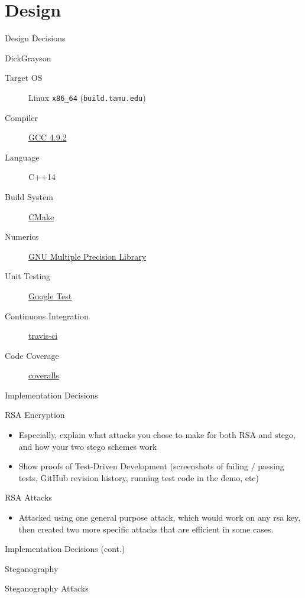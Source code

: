 \documentclass[presentation]{beamer}
\begin{document}
\section{Design}
\label{sec:orgheadline1}
\begin{frame}[fragile,label=sec-2-1]{Design Decisions}
 \begin{block}{DickGrayson}
\begin{description}
\item[{Target OS}] Linux \texttt{x86\_64} (\texttt{build.tamu.edu})
\item[{Compiler}] \href{https://gcc.gnu.org/}{GCC 4.9.2}
\item[{Language}] C++14
\item[{Build System}] \href{https://cmake.org}{CMake}
\item[{Numerics}] \href{https://gmplib.org}{GNU Multiple Precision Library}
\item[{Unit Testing}] \href{https://code.google.com/p/googletest/}{Google Test}
\item[{Continuous Integration}] \href{http://travis-ci.org}{travis-ci}
\item[{Code Coverage}] \href{http://coveralls.io}{coveralls}
\end{description}
\end{block}
\end{frame}
\begin{frame}[label=sec-2-2]{Implementation Decisions}
\begin{block}{RSA Encryption}
\begin{itemize}
\item Especially, explain what attacks you chose to make for both RSA and stego, and
how your two stego schemes work
\item Show proofs of Test-Driven Development (screenshots of failing / passing
tests, GitHub revision history, running test code in the demo, etc)
\end{itemize}
\end{block}
\begin{block}{RSA Attacks}
\begin{itemize}
\item Attacked using one general purpose attack, which would work on any rsa key, 
then created two more specific attacks that are efficient in some cases.
\end{itemize}
\end{block}
\end{frame}

\begin{frame}[label=sec-2-3]{Implementation Decisions (cont.)}
\begin{block}{Steganography}
\end{block}
\begin{block}{Steganography Attacks}
\end{block}
\end{frame}
\end{document}
